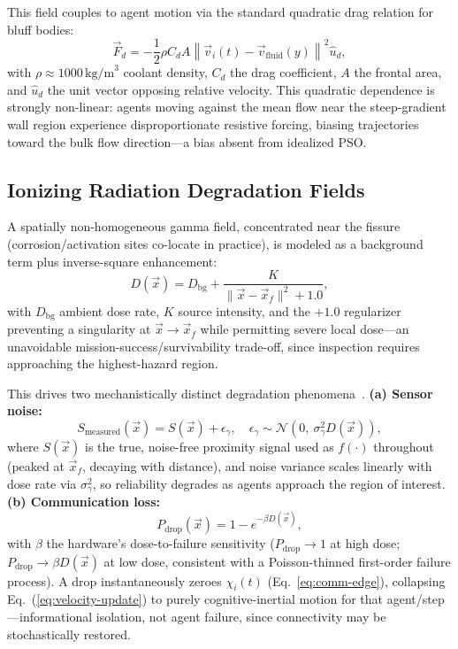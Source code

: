 \documentclass[conference]{IEEEtran}
\begin{document}
This field couples to agent motion via the standard quadratic drag relation for bluff bodies:
\begin{equation}
\vec{F}_d = -\frac{1}{2}\rho C_d A \left\|\vec{v}_i(t) - \vec{v}_{\text{fluid}}(y)\right\|^2 \hat{u}_d,
\label{eq:drag}
\end{equation}
with $\rho\approx1000\,\text{kg/m}^3$ coolant density, $C_d$ the drag coefficient, $A$ the frontal area, and $\hat{u}_d$ the unit vector opposing relative velocity. This quadratic dependence is strongly non-linear: agents moving against the mean flow near the steep-gradient wall region experience disproportionate resistive forcing, biasing trajectories toward the bulk flow direction---a bias absent from idealized PSO.

\subsection{Ionizing Radiation Degradation Fields}
\label{sec:radiation}

A spatially non-homogeneous gamma field, concentrated near the fissure (corrosion/activation sites co-locate in practice), is modeled as a background term plus inverse-square enhancement:
\begin{equation}
D(\vec{x}) = D_{\text{bg}} + \frac{K}{\|\vec{x}-\vec{x}_f\|^2 + 1.0},
\label{eq:dose}
\end{equation}
with $D_{\text{bg}}$ ambient dose rate, $K$ source intensity, and the $+1.0$ regularizer preventing a singularity at $\vec{x}\to\vec{x}_f$ while permitting severe local dose---an unavoidable mission-success/survivability trade-off, since inspection requires approaching the highest-hazard region.

This drives two mechanistically distinct degradation phenomena~\cite{sensor_degradation}. \textbf{(a) Sensor noise:}
\begin{equation}
S_{\text{measured}}(\vec{x}) = S(\vec{x}) + \epsilon_\gamma, \quad \epsilon_\gamma \sim \mathcal{N}(0,\ \sigma_\gamma^2 D(\vec{x})),
\label{eq:sensor-noise}
\end{equation}
where $S(\vec{x})$ is the true, noise-free proximity signal used as $f(\cdot)$ throughout (peaked at $\vec{x}_f$, decaying with distance), and noise variance scales linearly with dose rate via $\sigma_\gamma^2$, so reliability degrades as agents approach the region of interest. \textbf{(b) Communication loss:}
\begin{equation}
P_{\text{drop}}(\vec{x}) = 1 - e^{-\beta D(\vec{x})},
\label{eq:pdrop}
\end{equation}
with $\beta$ the hardware's dose-to-failure sensitivity ($P_{\text{drop}}\to1$ at high dose; $P_{\text{drop}}\to\beta D(\vec{x})$ at low dose, consistent with a Poisson-thinned first-order failure process). A drop instantaneously zeroes $\chi_i(t)$ (Eq.~\ref{eq:comm-edge}), collapsing Eq.~(\ref{eq:velocity-update}) to purely cognitive-inertial motion for that agent/step---informational isolation, not agent failure, since connectivity may be stochastically restored.
\end{document}
